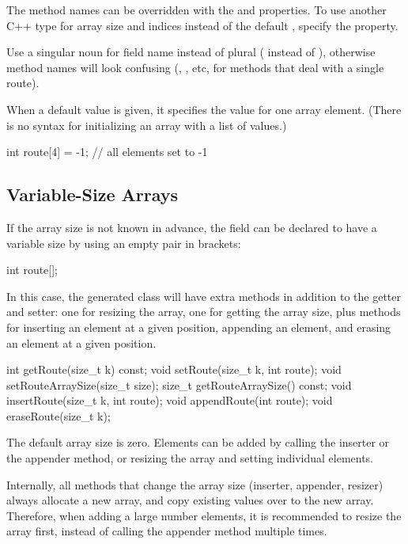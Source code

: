 The method names can be overridden with the  and 
properties. To use another C++ type for array size and indices instead of the
default , specify the  property.

\begin{note}
  Use a singular noun for field name instead of plural ( instead of
  ), otherwise method names will look confusing (,
  , etc, for methods that deal with a single route).
\end{note}

When a default value is given, it specifies the value for one array element.
(There is no syntax for initializing an array with a list of values.)

\begin{msg}
int route[4] = -1; // all elements set to -1
\end{msg}


\subsection{Variable-Size Arrays}
\label{sec:msg-defs:variable-size-arrays}

If the array size is not known in advance, the field can be declared
to have a variable size by using an empty pair in brackets:

\begin{msg}
int route[];
\end{msg}

In this case, the generated class will have extra methods in addition to the
getter and setter: one for resizing the array, one for getting the array size,
plus methods for inserting an element at a given position, appending an element,
and erasing an element at a given position.

\begin{cpp}
int getRoute(size_t k) const;
void setRoute(size_t k, int route);
void setRouteArraySize(size_t size);
size_t getRouteArraySize() const;
void insertRoute(size_t k, int route);
void appendRoute(int route);
void eraseRoute(size_t k);
\end{cpp}

The default array size is zero. Elements can be added by calling the inserter
or the appender method, or resizing the array and setting individual elements.

Internally, all methods that change the array size (inserter, appender, resizer)
always allocate a new array, and copy existing values over to the new array.
Therefore, when adding a large number elements, it is recommended to resize the
array first, instead of calling the appender method multiple times.


